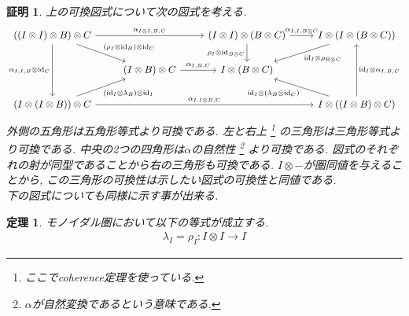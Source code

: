 \documentclass[a4paper,12pt]{ltjsarticle}
\theoremstyle{break}
\newtheorem{thrm}[thm]{定理}
\newtheorem*{prf}{証明}
\newcommand{\id}{\mathrm{id}}
\newcommand{\al}{\alpha}
\newcommand{\la}{\lambda}
\newcommand{\ot}{\otimes}
\numberwithin{equation}{section}
\begin{document}
\begin{prf}
  上の可換図式について次の図式を考える. 
  \[\begin{tikzcd}
    {((I \ot I) \ot B) \ot C} && {(I \ot I) \ot (B \ot C)} & {I \ot (I \ot (B \ot C))} \\
    & {(I \ot B) \ot C} & {I \ot (B \ot C)} \\
    {(I \ot (I \ot B)) \ot C} &&& {I \ot ((I \ot B) \ot C) }
    \arrow["{(\rho_I \ot \id_B) \ot \id_C}", from=1-1, to=2-2]
    \arrow["{\al_{I,I,B} \ot \id_C}"', from=1-1, to=3-1]
    \arrow["{(\id_I \ot \la_B) \ot \id_I}"', from=3-1, to=2-2]
    \arrow["{\al_{I,B,C}}", from=2-2, to=2-3]
    \arrow["{\al_{I \ot I,B,C}}", from=1-1, to=1-3]
    \arrow["{\rho_I \ot \id_{B \ot C}}"', from=1-3, to=2-3]
    \arrow["{\al_{I,I,B \ot C}}", from=1-3, to=1-4]
    \arrow["{\al_{I,I \ot B,C}}", from=3-1, to=3-4]
    \arrow["{\id_I \ot (\la_B \ot \id_C)}", from=3-4, to=2-3]
    \arrow["{\id_I \ot \al_{I,B,C}}"', from=3-4, to=1-4]
    \arrow["{\id_I \ot \rho_{B \ot C}}", from=1-4, to=2-3]
  \end{tikzcd}\]
  外側の五角形は五角形等式より可換である. 
  左と右上
  \footnote{
    ここでcoherence定理を使っている. 
  }
  の三角形は三角形等式より可換である. %
  中央の2つの四角形は$\al$の自然性
  \footnote{
    $\al$が自然変換であるという意味である. 
  }
  より可換である.
  図式のそれぞれの射が同型であることから右の三角形も可換である. 
  $I \ot -$が圏同値を与えることから, この三角形の可換性は示したい図式の可換性と同値である. \\
  下の図式についても同様に示す事が出来る. 
\end{prf}

\begin{thrm}
  モノイダル圏において以下の等式が成立する. 
  \begin{align*}
    \la_I =\rho_I :I \ot I \to I
  \end{align*}
\end{thrm}
\end{document}
